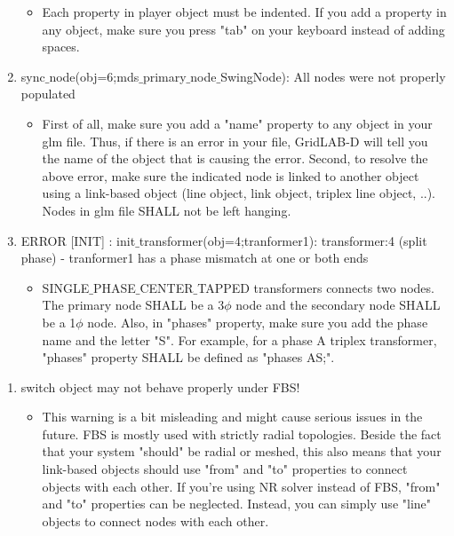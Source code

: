 \documentclass{article}
\begin{document}
\begin{enumerate}
        \begin{itemize}
            \item Each property in player object must be indented. If you add a property in any object, make sure you press "tab" on your keyboard instead of adding spaces.
        \end{itemize}
        \item sync$\_$node(obj=6;mds$\_$primary$\_$node$\_$SwingNode): All nodes were not properly populated
        \begin{itemize}
            \item First of all, make sure you add a "name" property to any object in your glm file. Thus, if there is an error in your file, GridLAB-D will tell you the name of the object that is causing the error. Second, to resolve the above error, make sure the indicated node is linked to another object using a link-based object (line object, link object, triplex line object, ..). Nodes in glm file SHALL not be left hanging.
        \end{itemize}
        \item ERROR [INIT] : init$\_$transformer(obj=4;tranformer1): transformer:4 (split phase) - tranformer1 has a phase mismatch at one or both ends
        \begin{itemize}
            \item SINGLE$\_$PHASE$\_$CENTER$\_$TAPPED transformers connects two nodes. The primary node SHALL be a 3$\phi$ node and the secondary node SHALL be a 1$\phi$ node. Also, in "phases" property, make sure you add the phase name and the letter "S". For example, for a phase A triplex transformer, "phases" property SHALL be defined as "phases AS;".
        \end{itemize}
    \end{enumerate}
    \newpage
    \listofwarnings
    \begin{enumerate}
        \item switch object may not behave properly under FBS!
        \begin{itemize}
            \item This warning is a bit misleading and might cause serious issues in the future. FBS is mostly used with strictly radial topologies. Beside the fact that your system "should" be radial or meshed, this also means that your link-based objects should use "from" and "to" properties to connect objects with each other. If you're using NR solver instead of FBS, "from" and "to" properties can be neglected. Instead, you can simply use "line" objects to connect nodes with each other.
        \end{itemize}
    \end{enumerate}
    \newpage
    
    
    
    
    \newpage
    \nocite{*}
    
    
\end{document}
